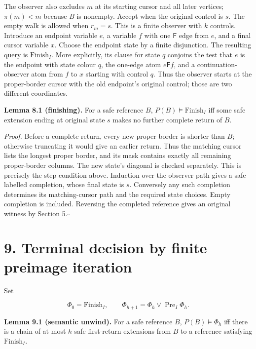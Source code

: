 \documentclass[
  11pt,
  a4paper,
]{article}
\newcounter{none} %
\begin{document}
The observer also excludes \(m\) at its starting cursor and all later
vertices; \(\pi(m)<m\) because \(B\) is nonempty. Accept when the
original control is \(s\). The empty walk is allowed when \(r_m=s\).
This is a finite observer with \(k\) controls. Introduce an endpoint
variable \(e\), a variable \(f\) with one \(\mathsf F\) edge from \(e\),
and a final cursor variable \(x\). Choose the endpoint state by a finite
disjunction. The resulting query is \(\mathrm{Finish}_I\). More
explicitly, its clause for state \(q\) conjoins the test that \(e\) is
the endpoint with state colour \(q\), the one-edge atom
\(e\mathrel{\mathsf F}f\), and a continuation-observer atom from \(f\)
to \(x\) starting with control \(q\). Thus the observer starts at the
proper-border cursor with the old endpoint's original control; those are
two different coordinates.


\textbf{Lemma 8.1 (finishing).} For a safe reference \(B\),
\(P(B)\models\mathrm{Finish}_I\) iff some safe extension ending at
original state \(s\) makes no further complete return of \(B\).

\emph{Proof.} Before a complete return, every new proper border is
shorter than \(B\); otherwise truncating it would give an earlier
return. Thus the matching cursor lists the longest proper border, and
its mask contains exactly all remaining proper-border columns. The new
state's diagonal is checked separately. This is precisely the step
condition above. Induction over the observer path gives a safe labelled
completion, whose final state is \(s\). Conversely any such completion
determines its matching-cursor path and the required state choices.
Empty completion is included. Reversing the completed reference gives an
original witness by Section 5.\nobreak\hspace{.5em}\(\square\)


\section{9. Terminal decision by finite preimage
iteration}\label{terminal-decision-by-finite-preimage-iteration}

Set

\[\Phi_0=\mathrm{Finish}_I,\qquad
\Phi_{h+1}=\Phi_h\lor\operatorname{Pre}_I\Phi_h.\tag{9.1}\]


\textbf{Lemma 9.1 (semantic unwind).} For a safe reference \(B\),
\(P(B)\models\Phi_h\) iff there is a chain of at most \(h\) safe
first-return extensions from \(B\) to a reference satisfying
\(\mathrm{Finish}_I\).
\end{document}
